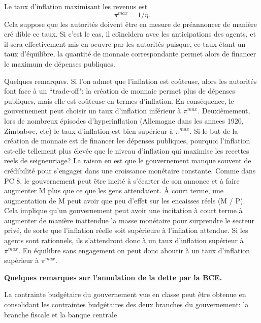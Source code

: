 \documentclass[a4paper,11pt]{article}
\begin{document}
Le taux d'inflation maximisant les revenus est  \begin{equation} \pi^{max}=1/\eta.  \end{equation} Cela suppose que les autorit\'{e}s
doivent \^{e}tre en mesure de pr\'{e}annoncer de mani\`{e}re cr\'{e}%
dible ce taux. Si c'est le cas, il co\"{\i}ncidera avec les anticipations
des agents, et il sera effectivement mis en oeuvre par les autorit\'{e}s
puisque, ce taux \'{e}tant un taux d'\'{e}quilibre, la quantit\'{e} de
monnaie correspondante permet alors de financer le maximum de d\'{e}penses publiques. 
\bigskip


Quelques remarques. Si l'on admet que l'inflation est co\^{u}teuse, alors les autorit\'{e}s
font face à un ``trade-off": la création de monnaie permet plus de dépenses publiques, mais elle est coûteuse en termes d'inflation. En conséquence, le gouvernement peut choisir un taux d'inflation inférieur à $ \pi^{max} $. Deuxièmement, lors de nombreux épisodes d'hyperinflation (Allemagne dans les annees 1920, Zimbabwe, etc) le taux d'inflation est bien supérieur à $\pi^{max} $. Si le but de la création de monnaie est de financer les dépenses publiques, pourquoi l'inflation est-elle tellement plus élevée que le niveau d'inflation qui maximise les recettes reels de seigneuriage? La raison en est que le gouvernement manque souvent de crédibilité pour s'engager dans une croissance monétaire constante. Comme dans PC 8, le gouvernement peut être incité à s'écarter de son annonce et à faire augmenter M plus que ce que les gens attendaient. À court terme, une augmentation de M peut avoir que peu d'effet sur les  encaisses r\'{e}els (M / P). Cela implique qu'un gouvernement peut avoir une incitation à court terme à augmenter de manière inattendue la masse monétaire pour surprendre le secteur privé, de sorte que l'inflation réelle soit supérieure à l'inflation attendue.
Si les agents sont rationnels, ils s'attendront donc à un taux d'inflation supérieur à $ \pi^{max} $. En équilibre sans engagement on peut donc aboutir à un taux d'inflation supérieur à $ \pi^{max} $.


\bigskip
\bigskip

\bigskip

\textbf{Quelques remarques sur l'annulation de la dette par la BCE.}

\bigskip
La contrainte budgétaire du gouvernement vue en classe peut être obtenue en consolidant les contraintes budgétaires des deux branches du gouvernement: la branche fiscale et la banque centrale
\end{document}

